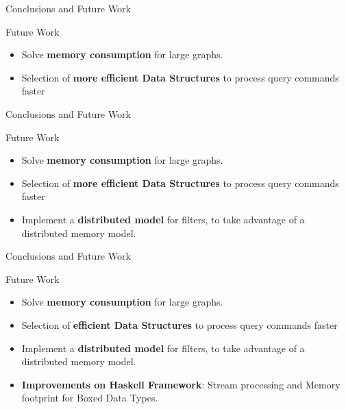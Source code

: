 \begin{frame}[fragile]{Conclusions and Future Work}
  \begin{block}{Future Work}      
    \begin{itemize}
      \item {\color{light}Solve \textbf{memory consumption} for large graphs.}
      \item Selection of \textbf{more efficient Data Structures} to process query commands faster
    \end{itemize}
  \end{block}
\end{frame}

\begin{frame}[fragile]{Conclusions and Future Work}
  \begin{block}{Future Work}      
    \begin{itemize}
      \item {\color{light}Solve \textbf{memory consumption} for large graphs.}
      \item {\color{light}Selection of \textbf{more efficient Data Structures} to process query commands faster}
      \item Implement a \textbf{distributed model} for filters, to take advantage of a distributed memory model.
    \end{itemize}
  \end{block}
\end{frame}

\begin{frame}[fragile]{Conclusions and Future Work}
  \begin{block}{Future Work}      
    \begin{itemize}
      \item {\color{light}Solve \textbf{memory consumption} for large graphs.}
      \item {\color{light}Selection of \textbf{efficient Data Structures} to process query commands faster}
      \item {\color{light}Implement a \textbf{distributed model} for filters, to take advantage of a distributed memory model.}
      \item \textbf{Improvements on Haskell Framework}: Stream processing and Memory footprint for Boxed Data Types.
    \end{itemize}
  \end{block}
\end{frame}
